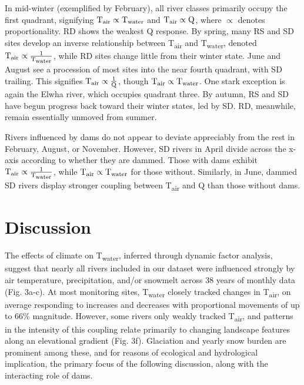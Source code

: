 \documentclass[notitlepage]{article}
\begin{document}
In mid-winter (exemplified by February), all river classes primarily occupy the first quadrant, signifying $\textrm{T}\textsubscript{air} \propto \textrm{T}\textsubscript{water}$ and $\textrm{T}\textsubscript{air} \propto \textrm{Q}$, where $\propto$ denotes proportionality. RD shows the weakest Q response. By spring, many RS and SD sites develop an inverse relationship between T\textsubscript{air} and T\textsubscript{water}, denoted $\textrm{T}\textsubscript{air} \propto \frac{1}{\textrm{T}\textsubscript{water}}$, while RD sites change little from their winter state. June and August see a procession of most sites into the near fourth quadrant, with SD trailing. This signifies $\textrm{T}\textsubscript{air} \propto \frac{1}{\textrm{Q}}$, though $\textrm{T}\textsubscript{air} \propto \textrm{T}\textsubscript{water}$. One stark exception is again the Elwha river, which occupies quadrant three. By autumn, RS and SD have begun progress back toward their winter states, led by SD. RD, meanwhile, remain essentially unmoved from summer.

Rivers influenced by dams do not appear to deviate appreciably from the rest in February, August, or November. However, SD rivers in April divide across the x-axis according to whether they are dammed. Those with dams exhibit $\textrm{T}\textsubscript{air} \propto \frac{1}{\textrm{T}\textsubscript{water}}$, while $\textrm{T}\textsubscript{air} \propto \textrm{T}\textsubscript{water}$ for those without. Similarly, in June, dammed SD rivers display stronger coupling between T\textsubscript{air} and Q than those without dams.

\section*{Discussion}

The effects of climate on T\textsubscript{water}, inferred through dynamic factor analysis, suggest that nearly all rivers included in our dataset were influenced strongly by air temperature, precipitation, and/or snowmelt across 38 years of monthly data (Fig. 3a-c). At most monitoring sites, T\textsubscript{water} closely tracked changes in T\textsubscript{air}, on average responding to increases and decreases with proportional movements of up to 66\% magnitude. However, some rivers only weakly tracked T\textsubscript{air}, and patterns in the intensity of this coupling relate primarily to changing landscape features along an elevational gradient (Fig. 3f). Glaciation and yearly snow burden are prominent among these, and for reasons of ecological and hydrological implication, the primary focus of the following discussion, along with the interacting role of dams.
\end{document}
